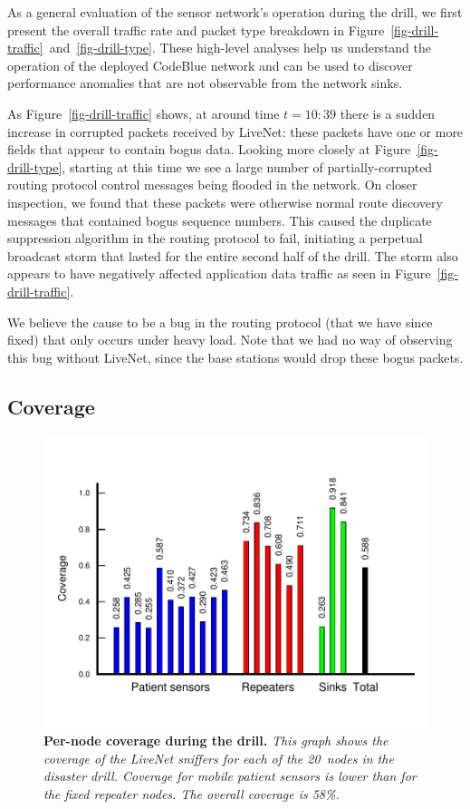 As a general evaluation of the sensor network's operation during the
drill, we first present the overall traffic rate and packet type
breakdown in Figure~\ref{fig-drill-traffic}~and~\ref{fig-drill-type}.
These high-level analyses help us understand the operation of the
deployed CodeBlue network and can be used to discover performance 
anomalies that are not observable from the network sinks.

As Figure~\ref{fig-drill-traffic} shows, at around time
$t=10:39$ there is a sudden increase in corrupted packets received
by LiveNet: these packets have one or more fields that appear to
contain bogus data. Looking more closely at Figure~\ref{fig-drill-type}, 
starting at this time we see a large number of partially-corrupted
routing protocol control messages being flooded in the network. 
On closer inspection, we found that these packets were otherwise
normal route discovery messages that contained bogus
sequence numbers. This caused the duplicate suppression 
algorithm in the routing protocol to fail, initiating a perpetual
broadcast storm that lasted for the entire second half of the drill.
The storm also appears to have negatively affected application
data traffic as seen in Figure~\ref{fig-drill-traffic}.

We believe the cause to be a bug in the routing protocol (that we
have since fixed) that only occurs under heavy load. Note that we 
had no way of observing this bug without LiveNet, since the 
base stations would drop these bogus packets.

\subsection{Coverage}
\label{sec-livenet-drill-coverage}

\begin{figure}[t]
\begin{center}
\includegraphics[width=0.6\hsize]{./resources/livenet-sensys07/figs/coverage/drill/drill-coverage-bynode.pdf}
\end{center}
\caption{\small {\bf Per-node coverage during the drill.}
{\em This graph shows the coverage of the LiveNet sniffers for
each of the 20~nodes in the disaster drill. Coverage for mobile patient
sensors is lower than for the fixed repeater nodes. The
overall coverage is 58\%.}}
\label{fig-drill-coverage}
\end{figure}

